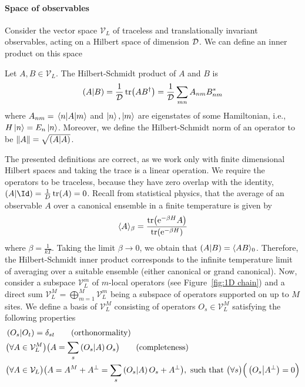 \paragraph{Space of observables}Consider the vector space \(\mathcal{V}_L\) of traceless and translationally invariant
observables, acting on a Hilbert space of dimension \(\mathcal{D}\). We can define an inner product on this space
\begin{definition}
  Let \(A,B \in \mathcal{V}_L\). The Hilbert-Schmidt product of \(A\) and \(B\) is
  \begin{equation}
    \left(A \middle| B\right) = \frac{1}{\mathcal{D}}\tr(AB^{\dagger}) = \frac{1}{\mathcal{D}} \sum_{mn} A_{nm}B_{nm}^{\ast}
  \end{equation}
  where \(A_{nm} = \matrixel{n}{A}{m}\) and \(\ket{n},\ket{m}\) are eigenstates of some Hamiltonian,
  i.e., \(H\ket{n} = E_n \ket{n}\).
  Moreover, we define the Hilbert-Schmidt norm of an operator to be \(\norm{A} = \sqrt{\left(A \middle| A\right)}\).
\end{definition}
The presented definitions are correct, as we work only with finite dimensional Hilbert spaces and taking
the trace is a linear operation. We require the operators to be traceless, because they have zero 
overlap with the identity, \(\left(A|\Id\right)=\frac{1}{D}\tr(A) = 0\).
Recall from statistical physics, that the average of an observable \(A\) over a canonical ensemble
in a finite temperature is given by
\begin{equation}
  \langle A \rangle_{\beta} = \frac{\tr(\mathrm{e}^{-\beta H}A)}{\tr(\mathrm{e}^{-\beta H})}
\end{equation}
where \(\beta = \frac{1}{kT}\).
Taking the limit \(\beta \to 0\), we obtain that \(\left(A \middle| B\right) =  \langle AB \rangle_{0}\).
Therefore, the Hilbert-Schmidt inner product corresponds to the infinite temperature 
limit of averaging over a suitable ensemble (either canonical or grand canonical).
Now, consider a subspace \(\mathcal{V}_L^m\) of \(m\)-local operators (see Figure~\ref{fig:1D chain}) and a direct sum
\(\mathcal{V}_L^M = \bigoplus_{m = 1}^M \mathcal{V}_L^m\) being a subspace of operators supported on up to \(M\) sites.
We define a basis of \(\mathcal{V}_L^M\) consisting of operators \(O_s\in \mathcal{V}_L^M\)
satisfying the following properties
\begin{align}
   & \hs{O_s}{O_{t}} = \delta_{st} \tag{\text{orthonormality}}                                    \nonumber{}\\
   & \big(\forall A \in \mathcal{V}_L^M\big) \big(A = \sum_s \hs{O_s}{A} O_s\big) \tag{\text{completeness}}   \nonumber{}\\
   & \big(\forall A \in \mathcal{V}_L \big) \big( A = A^M + A^{\perp} = \sum_s \hs{O_s}{A} O_s + A^{\perp}\big) ,
  \text{ such that } \big(\forall s\big) \Big( \hs{O_s}{A^{\perp}} = 0\Big)\label{eq:basis}
\end{align}


